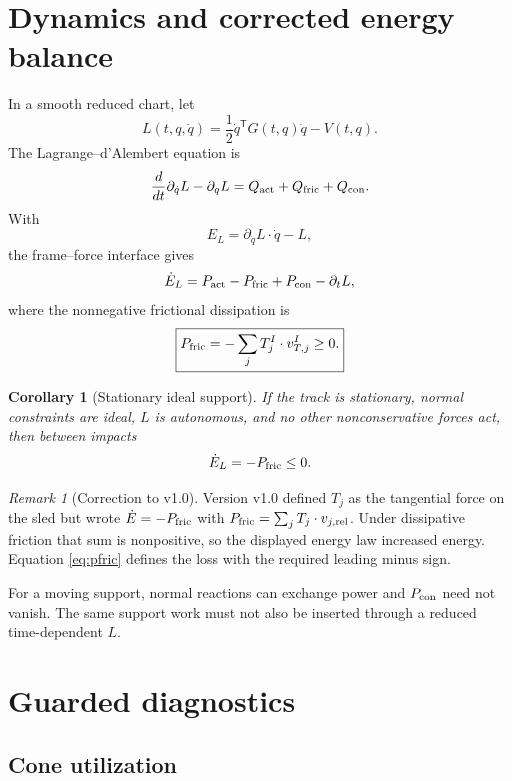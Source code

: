 \documentclass[11pt,a4paper]{article}
\theoremstyle{definition}
\theoremstyle{plain}
\newtheorem{corollary}[definition]{Corollary}
\theoremstyle{remark}
\newtheorem{remark}[definition]{Remark}
\newcommand{\dd}{\mathop{}\!d}
\begin{document}
\section{Dynamics and corrected energy balance}

In a smooth reduced chart, let
\[
L(t,q,\dot q)
=\frac12\dot q^{\mathsf T}G(t,q)\dot q-V(t,q).
\]
The Lagrange--d'Alembert equation is
\begin{equation}\label{eq:lda-bob}
\frac{\dd}{\dd t}\partial_{\dot q}L-\partial_qL
=Q_{\rm act}+Q_{\rm fric}+Q_{\rm con}.
\end{equation}
With
\[
E_L=\partial_{\dot q}L\cdot\dot q-L,
\]
the frame--force interface gives
\begin{equation}\label{eq:energy-general}
\dot E_L
=P_{\rm act}-P_{\rm fric}
+P_{\rm con}-\partial_tL,
\end{equation}
where the nonnegative frictional dissipation is
\begin{equation}\label{eq:pfric}
\boxed{
P_{\rm fric}
=-\sum_jT_j^I\cdot v_{T,j}^I\ge0 .
}
\end{equation}

\begin{corollary}[Stationary ideal support]
If the track is stationary, normal constraints are ideal, \(L\) is
autonomous, and no other nonconservative forces act, then between
impacts
\[
\dot E_L=-P_{\rm fric}\le0.
\]
\end{corollary}

\begin{remark}[Correction to v1.0]
Version v1.0 defined \(T_j\) as the tangential force on the sled but
wrote
\(\dot E=-P_{\rm fric}\) with
\(P_{\rm fric}=\sum_jT_j\cdot v_{j,\rm rel}\).
Under dissipative friction that sum is nonpositive, so the displayed
energy law increased energy. Equation \cref{eq:pfric} defines the loss
with the required leading minus sign.
\end{remark}

For a moving support, normal reactions can exchange power and
\(P_{\rm con}\) need not vanish. The same support work must not also
be inserted through a reduced time-dependent \(L\).

\section{Guarded diagnostics}

\subsection{Cone utilization}
\end{document}
